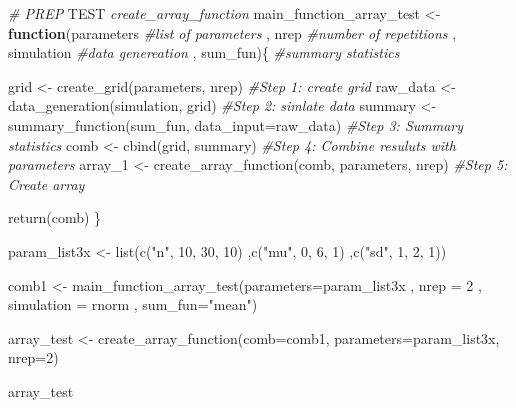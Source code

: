 \documentclass[11pt,a4paper]{article}
\newenvironment{Shaded}{\begin{snugshade}}{\end{snugshade}}
\newcommand{\AlertTok}[1]{\textcolor[rgb]{0.94,0.16,0.16}{#1}}
\newcommand{\AttributeTok}[1]{\textcolor[rgb]{0.77,0.63,0.00}{#1}}
\newcommand{\CommentTok}[1]{\textcolor[rgb]{0.56,0.35,0.01}{\textit{#1}}}
\newcommand{\ControlFlowTok}[1]{\textcolor[rgb]{0.13,0.29,0.53}{\textbf{#1}}}
\newcommand{\DecValTok}[1]{\textcolor[rgb]{0.00,0.00,0.81}{#1}}
\newcommand{\FunctionTok}[1]{\textcolor[rgb]{0.00,0.00,0.00}{#1}}
\newcommand{\NormalTok}[1]{#1}
\newcommand{\OtherTok}[1]{\textcolor[rgb]{0.56,0.35,0.01}{#1}}
\newcommand{\StringTok}[1]{\textcolor[rgb]{0.31,0.60,0.02}{#1}}
\begin{document}
\begin{Shaded}
\begin{Highlighting}[]
\CommentTok{\# PREP }\AlertTok{TEST}\CommentTok{ \textasciigrave{}create\_array\_function\textasciigrave{}}
\NormalTok{main\_function\_array\_test }\OtherTok{\textless{}{-}}  \ControlFlowTok{function}\NormalTok{(parameters }\CommentTok{\#list of parameters}
\NormalTok{                                      , nrep }\CommentTok{\#number of repetitions}
\NormalTok{                                      , simulation }\CommentTok{\#data genereation}
\NormalTok{                                      , sum\_fun)\{ }\CommentTok{\#summary statistics}
  
\NormalTok{  grid }\OtherTok{\textless{}{-}} \FunctionTok{create\_grid}\NormalTok{(parameters, nrep) }\CommentTok{\#Step 1: create grid}
\NormalTok{  raw\_data }\OtherTok{\textless{}{-}} \FunctionTok{data\_generation}\NormalTok{(simulation, grid) }\CommentTok{\#Step 2: simlate data}
\NormalTok{  summary }\OtherTok{\textless{}{-}} \FunctionTok{summary\_function}\NormalTok{(sum\_fun, }\AttributeTok{data\_input=}\NormalTok{raw\_data) }\CommentTok{\#Step 3: Summary statistics}
\NormalTok{  comb }\OtherTok{\textless{}{-}} \FunctionTok{cbind}\NormalTok{(grid, summary) }\CommentTok{\#Step 4: Combine resuluts with parameters}
\NormalTok{  array\_1 }\OtherTok{\textless{}{-}} \FunctionTok{create\_array\_function}\NormalTok{(comb, parameters, nrep) }\CommentTok{\#Step 5: Create array}
  
  \FunctionTok{return}\NormalTok{(comb)}
\NormalTok{\}}





\NormalTok{param\_list3x }\OtherTok{\textless{}{-}} \FunctionTok{list}\NormalTok{(}\FunctionTok{c}\NormalTok{(}\StringTok{"n"}\NormalTok{, }\DecValTok{10}\NormalTok{, }\DecValTok{30}\NormalTok{, }\DecValTok{10}\NormalTok{)}
\NormalTok{                     ,}\FunctionTok{c}\NormalTok{(}\StringTok{"mu"}\NormalTok{, }\DecValTok{0}\NormalTok{, }\DecValTok{6}\NormalTok{, }\DecValTok{1}\NormalTok{)}
\NormalTok{                     ,}\FunctionTok{c}\NormalTok{(}\StringTok{"sd"}\NormalTok{, }\DecValTok{1}\NormalTok{, }\DecValTok{2}\NormalTok{, }\DecValTok{1}\NormalTok{))}

\NormalTok{comb1 }\OtherTok{\textless{}{-}} \FunctionTok{main\_function\_array\_test}\NormalTok{(}\AttributeTok{parameters=}\NormalTok{param\_list3x}
\NormalTok{                                  , }\AttributeTok{nrep =} \DecValTok{2}
\NormalTok{                                  , }\AttributeTok{simulation =}\NormalTok{ rnorm}
\NormalTok{                                  , }\AttributeTok{sum\_fun=}\StringTok{"mean"}\NormalTok{)}

\NormalTok{array\_test }\OtherTok{\textless{}{-}} \FunctionTok{create\_array\_function}\NormalTok{(}\AttributeTok{comb=}\NormalTok{comb1,}
                                    \AttributeTok{parameters=}\NormalTok{param\_list3x, }\AttributeTok{nrep=}\DecValTok{2}\NormalTok{)}

\NormalTok{array\_test}
\end{Highlighting}
\end{Shaded}
\end{document}
